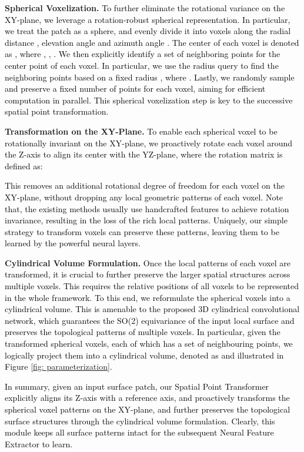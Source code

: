\documentclass[final]{cvpr}
\newcommand{\qy}[1]{\textcolor{black}{#1}}
\newcommand{\bo}[1]{\textcolor{black}{#1}}
\begin{document}
\textbf{Spherical Voxelization.} \qy{
To further eliminate the rotational variance on the XY-plane, we leverage a rotation-robust spherical representation. In particular, we treat the patch  as a sphere, and evenly divide it into  voxels along the radial distance , elevation angle  and azimuth angle . The center of each voxel is denoted as , where , , . We then explicitly identify a set of neighboring points for the center point  of each voxel. In particular, we use the radius query to find the neighboring points  based on a fixed radius , where . Lastly, we randomly sample and preserve a fixed number of  points for each voxel, aiming for efficient computation in parallel. This spherical voxelization step is key to the successive spatial point transformation.}

\textbf{Transformation on the XY-Plane.} \qy{To enable each spherical voxel to be rotationally invariant on the XY-plane,
we proactively rotate each voxel around the Z-axis to align its center  with the YZ-plane, where the rotation matrix  is defined as:}

\qy{This removes an additional rotational degree of freedom for each voxel on the XY-plane, without dropping any local geometric patterns of each voxel. Note that, the existing methods \cite{Spezialetti2019a,you2020pointwise} usually use handcrafted features to achieve rotation invariance, resulting in the loss of the rich local patterns. Uniquely, our simple strategy to transform voxels can preserve these patterns, leaving them to be learned by the powerful neural layers.
}

{\bf Cylindrical Volume Formulation.} \qy{
\bo{Once the local patterns of each voxel are transformed, it is crucial to further preserve the larger spatial structures across multiple voxels. This requires the relative positions of all voxels to be represented in the whole framework. 
To this end, we reformulate the spherical voxels into a cylindrical volume. This is amenable to the proposed 3D cylindrical convolutional network, which guarantees the SO(2) equivariance  of the input local surface and preserves the topological patterns of multiple voxels.}}
\bo{In particular, given the transformed spherical voxels, each of which has a set of neighbouring points, we logically project them into a cylindrical volume, denoted as  and illustrated in Figure \ref{fig: parameterization}.
}

\bo{In summary, given an input surface patch, our Spatial Point Transformer explicitly aligns its Z-axis with a reference axis, and proactively transforms the spherical voxel patterns on the XY-plane, and further preserves the topological surface structures through the cylindrical volume formulation. Clearly, this module keeps all surface patterns intact for the subsequent Neural Feature Extractor to learn.}
\end{document}
